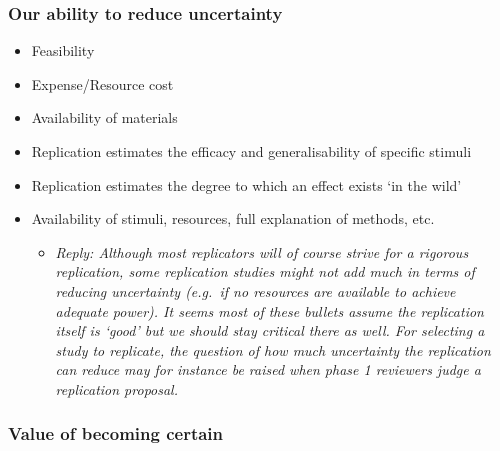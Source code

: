 \documentclass[
]{article}
\providecommand{\tightlist}{%
  \setlength{\itemsep}{0pt}\setlength{\parskip}{0pt}}
\begin{document}
\hypertarget{our-ability-to-reduce-uncertainty}{%
\subsubsection{Our ability to reduce
uncertainty}\label{our-ability-to-reduce-uncertainty}}

\begin{itemize}
\item
  Feasibility
\item
  Expense/Resource cost
\item
  Availability of materials
\item
  Replication estimates the efficacy and generalisability of specific
  stimuli
\item
  Replication estimates the degree to which an effect exists `in the
  wild'
\item
  Availability of stimuli, resources, full explanation of methods, etc.

  \begin{itemize}
  \tightlist
  \item
    \emph{Reply: Although most replicators will of course strive for a
    rigorous replication, some replication studies might not add much in
    terms of reducing uncertainty (e.g.~if no resources are available to
    achieve adequate power). It seems most of these bullets assume the
    replication itself is `good' but we should stay critical there as
    well. For selecting a study to replicate, the question of how much
    uncertainty the replication can reduce may for instance be raised
    when phase 1 reviewers judge a replication proposal.}
  \end{itemize}
\end{itemize}

\hypertarget{value-of-becoming-certain}{%
\subsubsection{Value of becoming
certain}\label{value-of-becoming-certain}}
\end{document}

